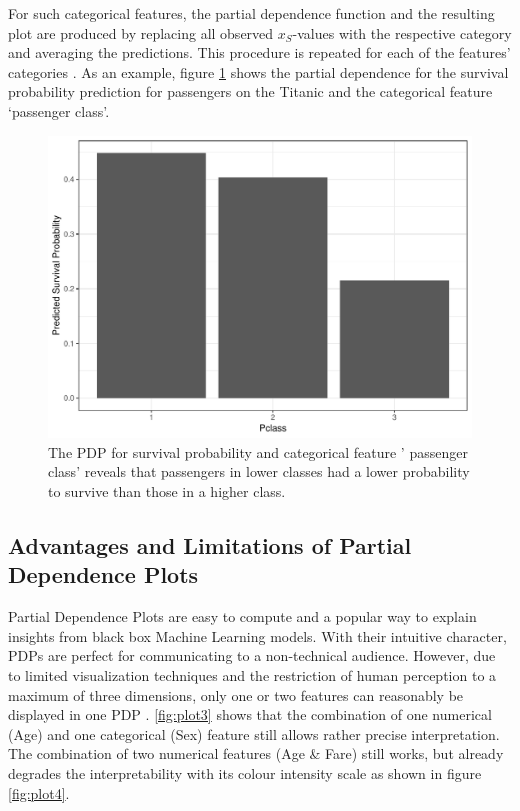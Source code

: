 \documentclass[]{krantz}
\begin{document}
For such categorical features, the partial dependence function and the
resulting plot are produced by replacing all observed \(x_S\)-values
with the respective category and averaging the predictions. This
procedure is repeated for each of the features' categories
\citep{molnar2019}. As an example, figure \ref{fig:plot2} shows the
partial dependence for the survival probability prediction for
passengers on the Titanic and the categorical feature `passenger class'.

\begin{figure}

{\centering \includegraphics[width=0.8\linewidth]{images/PDP_Plot_2} 

}

\caption{The PDP for survival probability and categorical feature ' passenger class' reveals that passengers in lower classes had a lower probability to survive than those in a higher class.}\label{fig:plot2}
\end{figure}

\subsection{Advantages and Limitations of Partial Dependence
Plots}\label{advantages-and-limitations-of-partial-dependence-plots}

Partial Dependence Plots are easy to compute and a popular way to
explain insights from black box Machine Learning models. With their
intuitive character, PDPs are perfect for communicating to a
non-technical audience. However, due to limited visualization techniques
and the restriction of human perception to a maximum of three
dimensions, only one or two features can reasonably be displayed in one
PDP \citep{molnar2019}. \ref{fig:plot3} shows that the combination of
one numerical (Age) and one categorical (Sex) feature still allows
rather precise interpretation. The combination of two numerical features
(Age \& Fare) still works, but already degrades the interpretability
with its colour intensity scale as shown in figure \ref{fig:plot4}.
\end{document}
